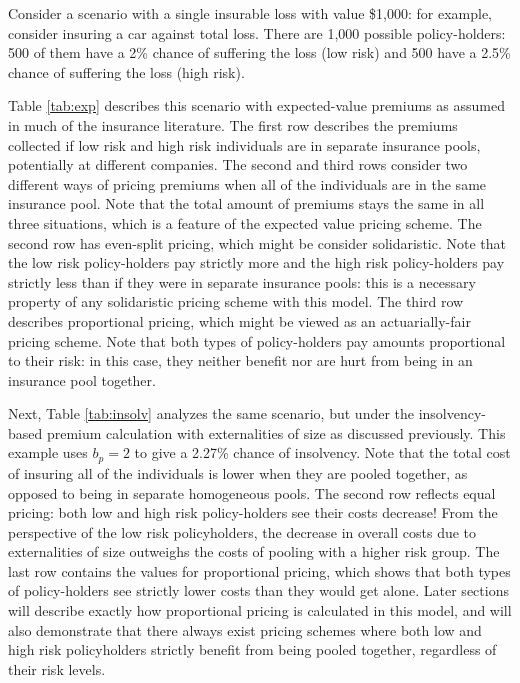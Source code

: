 \documentclass[sigconf]{acmart}
\newcommand{\bp}[0]{\ensuremath{b_p}}
\begin{document}
Consider a scenario with a single insurable loss with value \$1,000: for example, consider insuring a car against total loss. There are 1,000 possible policy-holders: 500 of them have a 2\% chance of suffering the loss (low risk) and 500 have a 2.5\% chance of suffering the loss (high risk).

Table \ref{tab:exp} describes this scenario with expected-value premiums as assumed in much of the insurance literature. The first row describes the premiums collected if low risk and high risk individuals are in separate insurance pools,  potentially at different companies. The second and third rows consider two different ways of pricing premiums when all of the individuals are in the same insurance pool.  Note that the total amount of premiums stays the same in all three situations, which is a feature of the expected value pricing scheme. The second row has even-split pricing, which might be consider solidaristic. Note that the low risk policy-holders pay strictly more and the high risk policy-holders pay strictly less than if they were in separate insurance pools: this is a necessary property of any solidaristic pricing scheme with this model. The third row describes proportional pricing, which might be viewed as an actuarially-fair pricing scheme. Note that both types of policy-holders pay amounts proportional to their risk: in this case, they neither benefit nor are hurt from being in an insurance pool together. 

Next, Table \ref{tab:insolv} analyzes the same scenario, but under the insolvency-based premium calculation with externalities of size as discussed previously. This example uses $\bp = 2$ to give a 2.27\% chance of insolvency. Note that the total cost of insuring all of the individuals is lower when they are pooled together, as opposed to being in separate homogeneous pools. The second row reflects equal pricing: both low and high risk policy-holders see their costs decrease! From the perspective of the low risk policyholders, the decrease in overall costs due to externalities of size outweighs the costs of pooling with a higher risk group. The last row contains the values for proportional pricing, which shows that both types of policy-holders see strictly lower costs than they would get alone. Later sections will describe exactly how proportional pricing is calculated in this model, and will also demonstrate that there always exist pricing schemes where both low and high risk policyholders strictly benefit from being pooled together, regardless of their risk levels.
\end{document}
